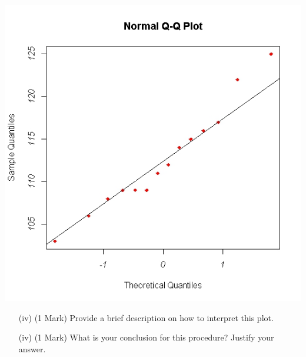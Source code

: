 \documentclass[a4paper,12pt]{article}
\begin{document}
\begin{enumerate}
\begin{center}
	\includegraphics[scale=0.55]{images/Q5examQQplot}
\end{center}

\begin{itemize}
	\item[(iv)] (1 Mark) Provide a brief description on how to interpret this plot.
	\item[(iv)] (1 Mark) What is your conclusion for this procedure? Justify your answer.
\end{itemize}

\end{enumerate}
\end{document}
